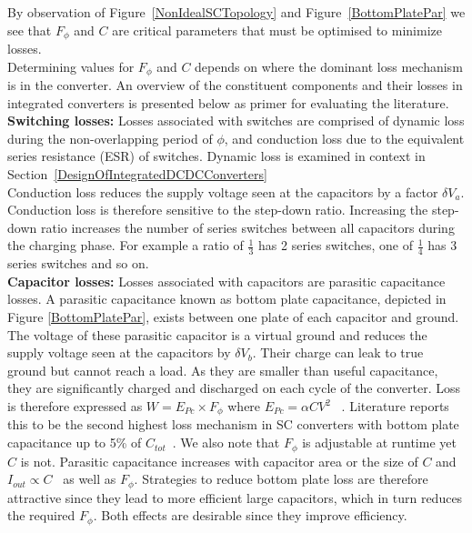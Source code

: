 \documentclass[letterpaper,twocolumn,10pt]{article}
\begin{document}
By observation of Figure~\ref{NonIdealSCTopology} and Figure~\ref{BottomPlatePar} we see that $F_\phi$ and $C$ are critical parameters that must be optimised to minimize losses.\\
Determining values for $F_\phi$ and $C$ depends on where the dominant loss mechanism is in the converter. An overview of the constituent components and their losses in integrated converters is presented below as primer for evaluating the literature.\\ 
\textbf{Switching losses: }Losses associated with switches are comprised of dynamic loss during the non-overlapping period of $\phi$, and conduction loss due to the equivalent series resistance (ESR) of switches. Dynamic loss is examined in context in Section~\ref{DesignOfIntegratedDCDCConverters}\\
Conduction loss reduces the supply voltage seen at the capacitors by a factor $\delta V_a$. Conduction loss is therefore sensitive to the step-down ratio. Increasing the step-down ratio increases the number of series switches between all capacitors during the charging phase. For example a ratio of $\frac{1}{3}$ has 2 series switches, one of $\frac{1}{4}$ has 3 series switches and so on.\\
\textbf{Capacitor losses: }Losses associated with capacitors are parasitic capacitance losses. A parasitic capacitance known as bottom plate capacitance, depicted in Figure \ref{BottomPlatePar}, exists between one plate of each capacitor and ground. The voltage of these parasitic capacitor is a virtual ground and reduces the supply voltage seen at the capacitors by $\delta V_b$. Their charge can leak to true ground but cannot reach a load. As they are smaller than useful capacitance, they are significantly charged and discharged on each cycle of the converter. Loss is therefore expressed as $W = E_{Pc} \times F_\phi$ where $E_{Pc} = \alpha CV^2$ ~\cite{Damak2013}. Literature reports this to be the second highest loss mechanism in SC converters with bottom plate capacitance up to 5\% of $C_{tot}$~\cite{Ramadass2007}. We also note that $F_\phi$ is adjustable at runtime yet $C$ is not. Parasitic capacitance increases with capacitor area or the size of $C$ and $I_{out} \propto C$~\cite{Damak2013} as well as $F_\phi$. Strategies to reduce bottom plate loss are therefore attractive since they lead to more efficient large capacitors, which in turn reduces the required $F_\phi$. Both effects are desirable since they improve efficiency.\\
\end{document}
